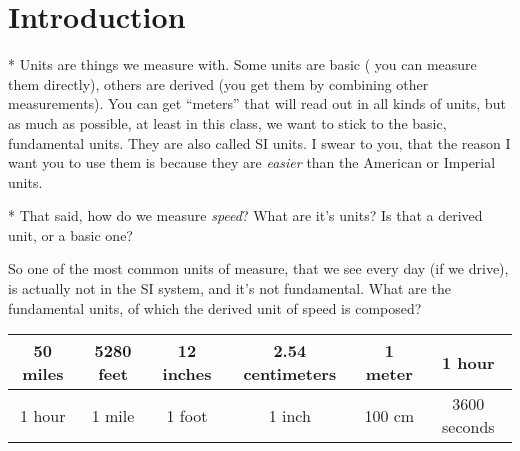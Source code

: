 \documentclass{article}[12]
\begin{document}
\section{Introduction}

* Units are things we measure with.  Some units are basic ( you can
measure them directly), others are derived (you get them by combining
other measurements).  You can get ``meters'' that will read out in all
kinds of units, but as much as possible, at least in this class, we
want to stick to the basic, fundamental units.  They are also called
SI units.  I swear to you, that the reason I want you to use them is
because they are \emph{easier} than the American or Imperial units.  

* That said, how do we measure \emph{speed}?  What are it's units?  Is
that a derived unit, or a basic one?

So one of the most common units of measure, that we see every day (if
we drive), is actually not in the SI system, and it's not
fundamental.  What are the fundamental units, of which the derived
unit of speed is composed?

\begin{tabular}{c|c|c|c|c|c}
50 miles & 5280 feet  & 12 inches & 2.54 centimeters & 1 meter & 1 hour \\
\hline
1 hour & 1 mile & 1 foot & 1 inch & 100 cm & 3600 seconds

\end{tabular}
\end{document}
